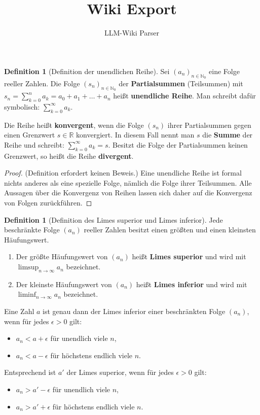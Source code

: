 \documentclass{article}
\theoremstyle{definition}
\newtheorem{definition}[satz]{Definition}
\begin{document}
\title{Wiki Export}
\author{LLM-Wiki Parser}
\maketitle

\begin{definition}[Definition der unendlichen Reihe]
Sei $(a_n)_{n \in \mathbb{N}_0}$ eine Folge reeller Zahlen. Die Folge $(s_n)_{n \in \mathbb{N}_0}$ der \textbf{Partialsummen} (Teilsummen) mit
$s_n = \sum_{k=0}^n a_k = a_0 + a_1 + \dots + a_n$
heißt \textbf{unendliche Reihe}. Man schreibt dafür symbolisch:
$\sum_{k=0}^\infty a_k$.

Die Reihe heißt \textbf{konvergent}, wenn die Folge $(s_n)$ ihrer Partialsummen gegen einen Grenzwert $s \in \mathbb{R}$ konvergiert. In diesem Fall nennt man $s$ die \textbf{Summe} der Reihe und schreibt:
$\sum_{k=0}^\infty a_k = s$.
Besitzt die Folge der Partialsummen keinen Grenzwert, so heißt die Reihe \textbf{divergent}.


\end{definition}
\begin{proof}
(Definition erfordert keinen Beweis.)
Eine unendliche Reihe ist formal nichts anderes als eine spezielle Folge, nämlich die Folge ihrer Teilsummen. Alle Aussagen über die Konvergenz von Reihen lassen sich daher auf die Konvergenz von Folgen zurückführen.
\end{proof}
\begin{definition}[Definition des Limes superior und Limes inferior]
Jede beschränkte Folge $(a_n)$ reeller Zahlen besitzt einen größten und einen kleinsten Häufungswert.

\begin{enumerate}
    \item Der größte Häufungswert von $(a_n)$ heißt \textbf{Limes superior} und wird mit $\limsup_{n \to \infty} a_n$ bezeichnet.
    \item Der kleinste Häufungswert von $(a_n)$ heißt \textbf{Limes inferior} und wird mit $\liminf_{n \to \infty} a_n$ bezeichnet.
\end{enumerate}

Eine Zahl $a$ ist genau dann der Limes inferior einer beschränkten Folge $(a_n)$, wenn für jedes $\epsilon > 0$ gilt:
\begin{itemize}
    \item $a_n < a + \epsilon$ für unendlich viele $n$,
    \item $a_n < a - \epsilon$ für höchstens endlich viele $n$.
\end{itemize}

Entsprechend ist $a'$ der Limes superior, wenn für jedes $\epsilon > 0$ gilt:
\begin{itemize}
    \item $a_n > a' - \epsilon$ für unendlich viele $n$,
    \item $a_n > a' + \epsilon$ für höchstens endlich viele $n$.
\end{itemize}


\end{definition}
\end{document}
